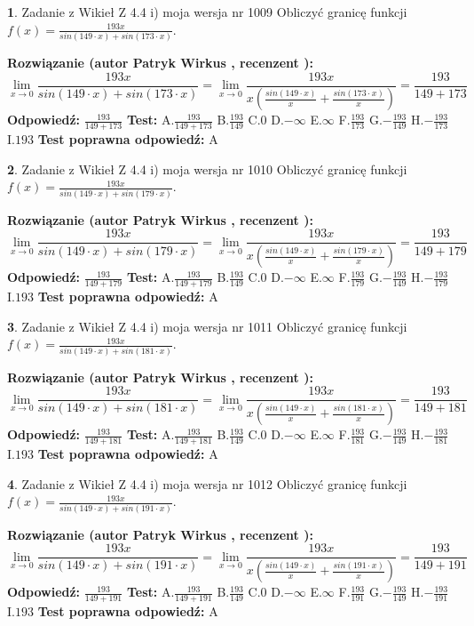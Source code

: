 \documentclass[12pt, a4paper]{article}
\theoremstyle{definition} %
\newtheorem{zad}{}
\newcommand{\zadStart}[1]{\begin{zad}#1\newline}
\newcommand{\zadStop}{\end{zad}}
\newcommand{\rozwStart}[2]{\noindent \textbf{Rozwiązanie (autor #1 , recenzent #2): }\newline}
\newcommand{\rozwStop}{\newline}
\newcommand{\odpStart}{\noindent \textbf{Odpowiedź:}\newline}
\newcommand{\odpStop}{\newline}
\newcommand{\testStart}{\noindent \textbf{Test:}\newline}
\newcommand{\testStop}{\newline}
\newcommand{\kluczStart}{\noindent \textbf{Test poprawna odpowiedź:}\newline}
\newcommand{\kluczStop}{\newline}
\begin{document}
\zadStart{Zadanie z Wikieł Z 4.4 i) moja wersja nr 1009}
Obliczyć granicę funkcji $f(x)=\frac{193x}{sin(149\cdot x) +sin(173\cdot x)}$.
\zadStop
\rozwStart{Patryk Wirkus}{}
$$\lim\limits_{x\to 0}\frac{193x}{sin(149\cdot x) +sin(173\cdot x)}=\lim\limits_{x\to 0}\frac{193x}{x(\frac{sin(149\cdot x)}{x}+\frac{sin(173\cdot x)}{x})}=\frac{193}{149+173}$$
\rozwStop
\odpStart
$\frac{193}{149+173}$
\odpStop
\testStart
A.$\frac{193}{149+173}$
B.$\frac{193}{149}$
C.$0$
D.$-\infty$
E.$\infty$
F.$\frac{193}{173}$
G.$-\frac{193}{149}$
H.$-\frac{193}{173}$
I.$193$
\testStop
\kluczStart
A
\kluczStop



\zadStart{Zadanie z Wikieł Z 4.4 i) moja wersja nr 1010}
Obliczyć granicę funkcji $f(x)=\frac{193x}{sin(149\cdot x) +sin(179\cdot x)}$.
\zadStop
\rozwStart{Patryk Wirkus}{}
$$\lim\limits_{x\to 0}\frac{193x}{sin(149\cdot x) +sin(179\cdot x)}=\lim\limits_{x\to 0}\frac{193x}{x(\frac{sin(149\cdot x)}{x}+\frac{sin(179\cdot x)}{x})}=\frac{193}{149+179}$$
\rozwStop
\odpStart
$\frac{193}{149+179}$
\odpStop
\testStart
A.$\frac{193}{149+179}$
B.$\frac{193}{149}$
C.$0$
D.$-\infty$
E.$\infty$
F.$\frac{193}{179}$
G.$-\frac{193}{149}$
H.$-\frac{193}{179}$
I.$193$
\testStop
\kluczStart
A
\kluczStop



\zadStart{Zadanie z Wikieł Z 4.4 i) moja wersja nr 1011}
Obliczyć granicę funkcji $f(x)=\frac{193x}{sin(149\cdot x) +sin(181\cdot x)}$.
\zadStop
\rozwStart{Patryk Wirkus}{}
$$\lim\limits_{x\to 0}\frac{193x}{sin(149\cdot x) +sin(181\cdot x)}=\lim\limits_{x\to 0}\frac{193x}{x(\frac{sin(149\cdot x)}{x}+\frac{sin(181\cdot x)}{x})}=\frac{193}{149+181}$$
\rozwStop
\odpStart
$\frac{193}{149+181}$
\odpStop
\testStart
A.$\frac{193}{149+181}$
B.$\frac{193}{149}$
C.$0$
D.$-\infty$
E.$\infty$
F.$\frac{193}{181}$
G.$-\frac{193}{149}$
H.$-\frac{193}{181}$
I.$193$
\testStop
\kluczStart
A
\kluczStop



\zadStart{Zadanie z Wikieł Z 4.4 i) moja wersja nr 1012}
Obliczyć granicę funkcji $f(x)=\frac{193x}{sin(149\cdot x) +sin(191\cdot x)}$.
\zadStop
\rozwStart{Patryk Wirkus}{}
$$\lim\limits_{x\to 0}\frac{193x}{sin(149\cdot x) +sin(191\cdot x)}=\lim\limits_{x\to 0}\frac{193x}{x(\frac{sin(149\cdot x)}{x}+\frac{sin(191\cdot x)}{x})}=\frac{193}{149+191}$$
\rozwStop
\odpStart
$\frac{193}{149+191}$
\odpStop
\testStart
A.$\frac{193}{149+191}$
B.$\frac{193}{149}$
C.$0$
D.$-\infty$
E.$\infty$
F.$\frac{193}{191}$
G.$-\frac{193}{149}$
H.$-\frac{193}{191}$
I.$193$
\testStop
\kluczStart
A
\kluczStop
\end{document}
